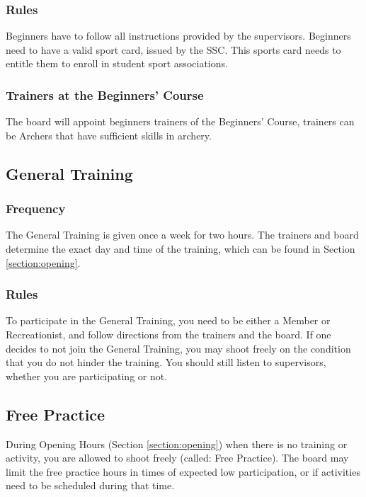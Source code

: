 \documentclass[a4paper]{article}
\begin{document}
\subsubsection{Rules}
{ Beginners} have to follow all instructions provided by the { supervisors}. { Beginners} need to have a valid sport card, issued by the { SSC}. This sports card needs to entitle them to enroll in student sport associations.

\subsubsection{Trainers at the Beginners' Course}
The board will appoint { beginners} trainers of the { Beginners' Course}, trainers can be { Archers} that have sufficient skills in archery.

\subsection{General Training}
\subsubsection{Frequency}
The { General Training} is given once a week for two hours. The trainers and board determine the exact day and time of the training, which can be found in Section \ref{section:opening}.

\subsubsection{Rules}
To participate in the { General Training}, you need to be either a { Member} or { Recreationist}, and follow directions from the trainers and the board. If one decides to not join the { General Training}, you may shoot freely on the condition that you do not hinder the training. You should still listen to { supervisors}, whether you are participating or not.

\subsection{Free Practice}
During Opening Hours (Section \ref{section:opening}) when there is no training or activity, you are allowed to shoot freely (called: Free Practice). The board may limit the free practice hours in times of expected low participation, or if activities need to be scheduled during that time. \\
\end{document}
